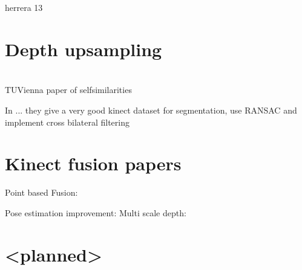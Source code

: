 \documentclass{ucl_thesis}
\begin{document}
herrera 13





\section{Depth upsampling}
\citep{MatsuoFI13} \\
\citep{} TUVienna paper of selfsimilarities

In \citep{Silberman:ECCV12} ... they give a very good kinect dataset for segmentation, use RANSAC and implement cross bilateral filtering

\section{Kinect fusion papers}
\label{sec:kinfu}

\citep{Zhou:2013}
\citep{Chen:2013:Scalable_volumetric}
\citep{Whelan13iros}
\citep{Whelan12rssw}
Point based Fusion:
\citep{keller13realtime}

Pose estimation improvement: \citep{Whelan13icra}
Multi scale depth: \citep{Fuhrmann:2011}

\section{<planned>}
\end{document}
